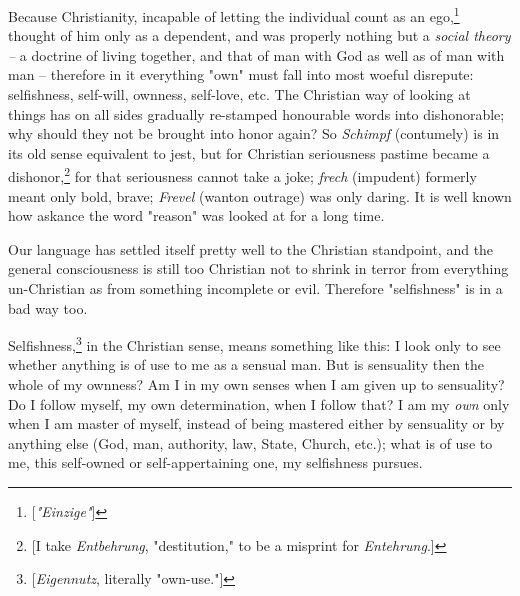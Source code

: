 \documentclass[a4paper]{book}
\begin{document}
Because Christianity, incapable of letting the individual count as an 
ego,\footnote{[\textit{"{}Einzige"{}}]} thought of him only as a dependent, 
and was properly nothing but a \textit{social theory --} a doctrine of living 
together, and that of man with God as well as of man with man -- therefore in 
it everything "{}own"{} must fall into most woeful disrepute: selfishness, 
self-will, ownness, self-love, etc. The Christian way of looking at things has 
on all sides gradually re-stamped honourable words into dishonorable; why 
should they not be brought into honor again? So \textit{Schimpf} (contumely) 
is in its old sense equivalent to jest, but for Christian seriousness pastime 
became a dishonor,\footnote{[I take \textit{Entbehrung}, "{}destitution,"{} to 
be a misprint for \textit{Entehrung}.]} for that seriousness cannot take a 
joke; \textit{frech} (impudent) formerly meant only bold, brave; 
\textit{Frevel} (wanton outrage) was only daring. It is well known how askance 
the word "{}reason"{} was looked at for a long time.

Our language has settled itself pretty well to the Christian standpoint, and 
the general consciousness is still too Christian not to shrink in terror from 
everything un-Christian as from something incomplete or evil. Therefore 
"{}selfishness"{} is in a bad way too.

Selfishness,\footnote{[\textit{Eigennutz}, literally "{}own-use."{}]} in the 
Christian sense, means something like this: I look only to see whether 
anything is of use to me as a sensual man. But is sensuality then the whole of 
my ownness? Am I in my own senses when I am given up to sensuality? Do I 
follow myself, my own determination, when I follow that? I am my \textit{own} 
only when I am master of myself, instead of being mastered either by 
sensuality or by anything else (God, man, authority, law, State, Church, 
etc.); what is of use to me, this self-owned or self-appertaining one, my 
selfishness pursues.
\end{document}
